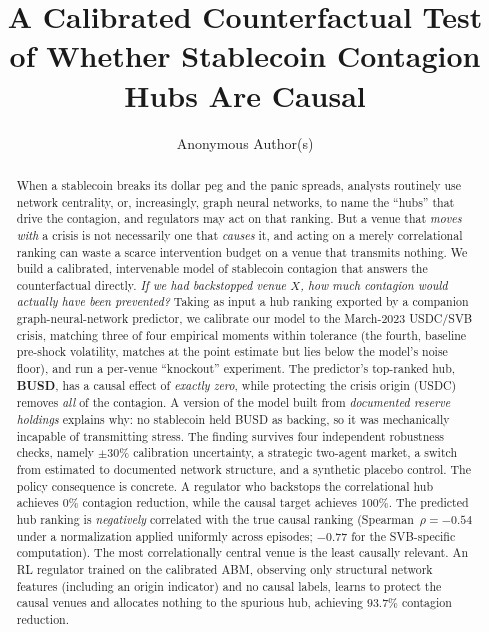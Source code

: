\documentclass[sigconf,anonymous]{acmart}
\begin{document}

\title{A Calibrated Counterfactual Test of Whether Stablecoin
Contagion Hubs Are Causal}

\author{Anonymous Author(s)}

\begin{abstract}
When a stablecoin breaks its dollar peg and the panic spreads, analysts routinely use network
centrality, or, increasingly, graph neural networks, to name the ``hubs'' that drive the
contagion, and regulators may act on that ranking. But a venue that \emph{moves with} a crisis is
not necessarily one that \emph{causes} it, and acting on a merely correlational ranking can waste a
scarce intervention budget on a venue that transmits nothing. We build a calibrated, intervenable
model of stablecoin contagion that answers the counterfactual directly. \emph{If we had backstopped venue $X$, how much contagion
would actually have been prevented?} Taking as input a hub ranking exported by a companion
graph-neural-network predictor, we calibrate our model to the March-2023 USDC/SVB crisis,
matching three of four empirical moments within tolerance (the fourth, baseline pre-shock
volatility, matches at the point estimate but lies below the model's noise floor), and run a
per-venue ``knockout'' experiment.
The predictor's top-ranked hub, \textbf{BUSD}, has a causal effect of \emph{exactly zero},
while protecting the crisis origin (USDC) removes \emph{all} of the contagion. A version of the
model built from \emph{documented reserve holdings} explains why: no stablecoin held BUSD as
backing, so it was mechanically incapable of transmitting stress. The finding survives four independent robustness checks, namely $\pm30\%$ calibration uncertainty,
a strategic two-agent market, a switch from estimated to documented network structure, and a
synthetic placebo control. The policy consequence is concrete. A regulator who backstops the
correlational hub achieves $0\%$ contagion reduction, while the causal target achieves $100\%$. The
predicted hub ranking is \emph{negatively} correlated with the true causal ranking
(Spearman~$\rho{=}{-}0.54$ under a normalization applied uniformly across episodes; $-0.77$
for the SVB-specific computation). The
most correlationally central venue is the least causally relevant. An RL regulator trained on
the calibrated ABM, observing only structural network features (including an origin indicator)
and no causal labels, learns to protect the causal venues and allocates nothing to the spurious
hub, achieving $93.7\%$ contagion reduction.
\end{abstract}
\end{document}
